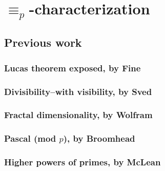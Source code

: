 
\chapter{$\equiv_{p}$-characterization}

\section{Previous work}
\subsection{Lucas theorem exposed, by Fine}
\subsection{Divisibility--with visibility, by Sved}
\subsection{Fractal dimensionality, by Wolfram}
\subsection{Pascal (mod $p$), by Broomhead}
\subsection{Higher powers of primes, by McLean}




